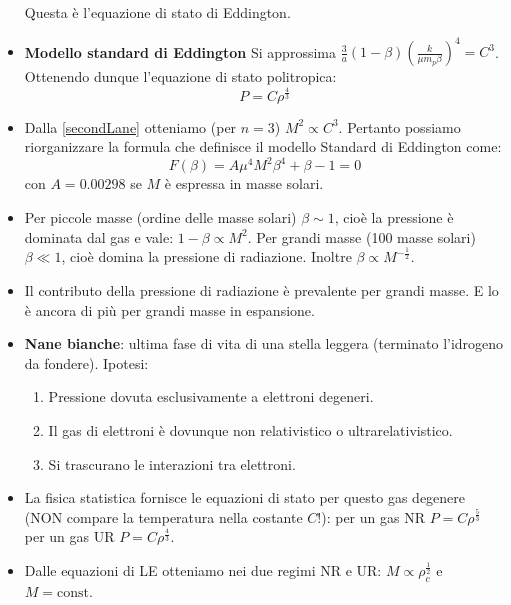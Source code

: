 \documentclass[11pt,a4paper]{article}
\begin{document}
\begin{itemize}
Questa è l'equazione di stato di Eddington.

\item \textbf{Modello standard di Eddington} Si approssima $\frac{3}{a} (1 - \beta ) \left( \frac{k}{\mu m_p \beta} \right) ^ 4 = C^3$. Ottenendo dunque l'equazione di stato politropica:
\begin{equation}
P = C \rho^{\frac{4}{3}}
\end{equation}

\item Dalla \ref{secondLane} otteniamo (per $n=3$) $M^2 \propto C^3$. Pertanto possiamo riorganizzare la formula che definisce il modello Standard di Eddington come:
\begin{equation}
F(\beta) = A \mu ^4 M ^ 2 \beta ^4 + \beta - 1 = 0
\end{equation}
con $A = 0.00298$ se $M$ è espressa in masse solari.

\item Per piccole masse (ordine delle masse solari) $\beta \sim 1$, cioè la pressione è dominata dal gas e vale: $1 - \beta \propto M^2$. Per grandi masse (100 masse solari) $\beta \ll 1$, cioè domina la pressione di radiazione. Inoltre $\beta \propto M^{-\frac{1}{2}}$.

\item Il contributo della pressione di radiazione è prevalente per grandi masse. E lo è ancora di più per grandi masse in espansione.

\item \textbf{Nane bianche}: ultima fase di vita di una stella leggera (terminato l'idrogeno da fondere). Ipotesi:

\begin{enumerate}
\item Pressione dovuta esclusivamente a elettroni degeneri.
\item Il gas di elettroni è dovunque non relativistico o ultrarelativistico.
\item Si trascurano le interazioni tra elettroni.
\end{enumerate}

\item La fisica statistica fornisce le equazioni di stato per questo gas degenere (NON compare la temperatura nella costante $C$!): per un gas NR $P = C \rho^{\frac{5}{3}}$ per un gas UR $P = C \rho^{\frac{4}{3}}$.

\item Dalle equazioni di LE otteniamo nei due regimi NR e UR: $M \propto \rho_c^{\frac{1}{2}}$ e $M = \text{const}$.


\end{itemize}
\end{document}
